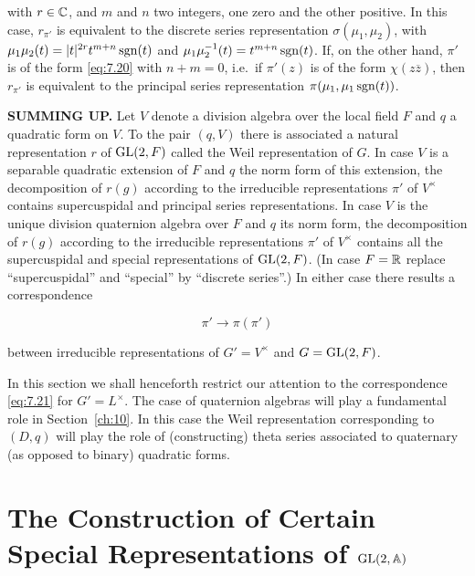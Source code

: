 \begin{remark}
with $r \in \mathbb{C}$, and $m$ and $n$ two integers, one zero and the other positive. In this case, $r_{\pi'}$ is equivalent to the discrete series representation $\sigma(\mu_1, \mu_2)$, with $\mu_1\mu_2(t) = |t|^{2r}t^{m+n}\operatorname{sgn}(t)$ and $\mu_1\mu_2^{-1}(t) = t^{m+n}\operatorname{sgn}(t)$. If, on the other hand, $\pi'$ is of the form \eqref{eq:7.20} with $n + m = 0$, i.e.\ if $\pi'(z)$ is of the form $\chi(z\overline{z})$, then $r_{\pi'}$ is equivalent to the principal series representation $\pi(\mu_1, \mu_1\operatorname{sgn}(t))$.

\end{remark}

\textbf{SUMMING UP.} Let $V$ denote a division algebra over the local field $F$ and $q$ a quadratic form on $V$. To the pair $(q,V)$ there is associated a natural representation $r$ of $\operatorname{GL}(2,F)$ called the Weil representation of $G$. In case $V$ is a separable quadratic extension of $F$ and $q$ the norm form of this extension, the decomposition of $r(g)$ according to the irreducible representations $\pi'$ of $V^{\times}$ contains supercuspidal and principal series representations. In case $V$ is the unique division quaternion algebra over $F$ and $q$ its norm form, the decomposition of $r(g)$ according to the irreducible representations $\pi'$ of $V^{\times}$ contains all the supercuspidal and special representations of $\operatorname{GL}(2,F)$. (In case $F = \mathbb{R}$ replace ``supercuspidal'' and ``special'' by ``discrete series''.) In either case there results a correspondence

\begin{equation}\label{eq:7.21}
\pi' \to \pi(\pi')\tag{7.21}
\end{equation}

between irreducible representations of $G' = V^{\times}$ and $G = \operatorname{GL}(2,F)$.

In this section we shall henceforth restrict our attention to the correspondence \eqref{eq:7.21} for $G' = L^{\times}$. The case of quaternion algebras will play a fundamental role in Section~\ref{ch:10}. In this case the Weil representation corresponding to $(D,q)$ will play the role of (constructing) theta series associated to quaternary (as opposed to binary) quadratic forms.

\section{The Construction of Certain Special Representations of \texorpdfstring{$\operatorname{GL}(2,\mathbb{A})$}{GL(2,A)}}\label{sec:7b}

